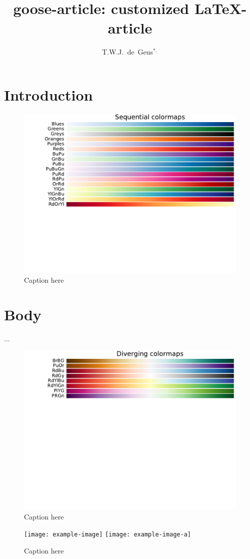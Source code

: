 \documentclass{goose-article}
\title{goose-article: customized \LaTeX-article}
\author[1]{T.W.J.~de~Geus$^{*,}$}
\affil[1]{
  Physics Institute, \'{E}cole Polytechnique F\'{e}d\'{e}rale de Lausanne (EPFL) \nl
  Switzerland
}
\begin{document}
\maketitle

\begin{abstract}
\noindent
\lipsum[1]

\end{abstract}

\section{Introduction}
\lipsum[2-4] \citep{Geus10,Geus11,Geus12}

\begin{figure}[htp]
  \centering
  \includegraphics[width=.5\linewidth]{figure_1}
  \caption{Caption here}
  \label{fig:a}
\end{figure}

\section{Body}
\lipsum[5-10] \citet{Geus13,Foo.Bar} ...

\begin{figure}[htp]
  \centering
  \includegraphics[width=.5\linewidth]{figure_2}
  \caption{Caption here}
  \label{fig:b}
\end{figure}

\begin{figure}[htp]
  \centering
  \texttt{[image: example-image]}
  \texttt{[image: example-image-a]}
  \caption{Caption here}
  \label{fig:c}
\end{figure}


\end{document}
